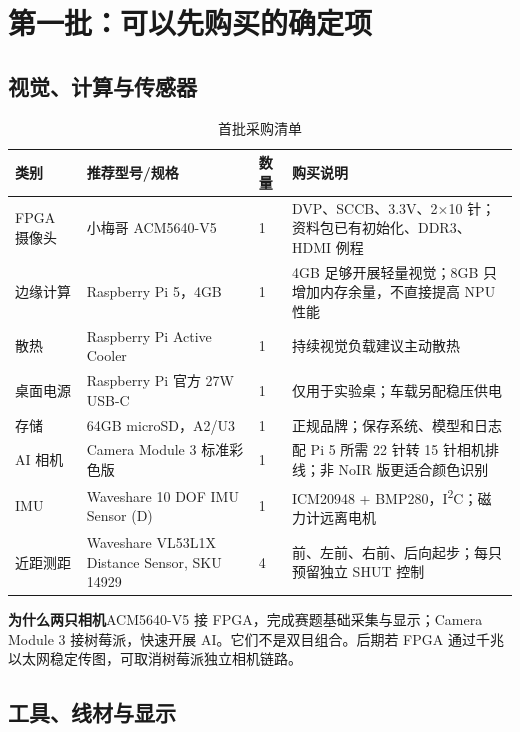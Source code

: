 \documentclass[UTF8,a4paper,zihao=-4,fontset=fandol]{ctexart}
\newcommand{\note}[2]{\par\smallskip\noindent\colorbox{Pale}{\parbox{\dimexpr\linewidth-2\fboxsep\relax}{\small\textbf{\color{Teal}#1}\quad #2}}\par\smallskip}
\newcommand{\newpagex}{\clearpage}
\begin{document}
\newpagex
\section{第一批：可以先购买的确定项}\label{sec:first}

\subsection{视觉、计算与传感器}

\begin{table}[H]\small
\caption{首批采购清单}\label{tab:first}
\begin{tabularx}{\linewidth}{@{}L{2.5cm}L{4.8cm}L{1cm}Y@{}}\toprule
\textbf{类别} & \textbf{推荐型号/规格} & \textbf{数量} & \textbf{购买说明}\\\midrule
FPGA 摄像头 & 小梅哥 ACM5640-V5 & 1 & DVP、SCCB、3.3V、2$\times$10 针；资料包已有初始化、DDR3、HDMI 例程\cite{cammanual,hdmimanual}\\
边缘计算 & Raspberry Pi 5，4GB & 1 & 4GB 足够开展轻量视觉；8GB 只增加内存余量，不直接提高 NPU 性能\cite{pi5}\\
散热 & Raspberry Pi Active Cooler & 1 & 持续视觉负载建议主动散热\cite{pi5}\\
桌面电源 & Raspberry Pi 官方 27W USB-C & 1 & 仅用于实验桌；车载另配稳压供电\cite{pi5}\\
存储 & 64GB microSD，A2/U3 & 1 & 正规品牌；保存系统、模型和日志\\
AI 相机 & Camera Module 3 标准彩色版 & 1 & 配 Pi 5 所需 22 针转 15 针相机排线；非 NoIR 版更适合颜色识别\cite{picam}\\
IMU & Waveshare 10 DOF IMU Sensor (D) & 1 & ICM20948 + BMP280，I\textsuperscript{2}C；磁力计远离电机\cite{imu}\\
近距测距 & Waveshare VL53L1X Distance Sensor, SKU 14929 & 4 & 前、左前、右前、后向起步；每只预留独立 SHUT 控制\cite{tof}\\\bottomrule
\end{tabularx}
\end{table}

\note{为什么两只相机}{ACM5640-V5 接 FPGA，完成赛题基础采集与显示；Camera Module 3 接树莓派，快速开展 AI。它们不是双目组合。后期若 FPGA 通过千兆以太网稳定传图，可取消树莓派独立相机链路。}

\subsection{工具、线材与显示}
\end{document}
